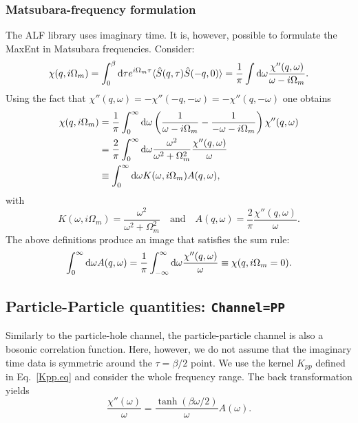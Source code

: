 \subsubsection*{Matsubara-frequency formulation}
The ALF  library uses  imaginary time. It is, however, possible to formulate the MaxEnt in  Matsubara frequencies.
Consider:
\begin{equation}
  \chi(q,i\Omega_m) = \int_0^{\beta} \mathrm{d} \tau  e^{i \Omega_m \tau}
	\langle \hat{S}(q,\tau) \hat{S}(-q,0) \rangle  = \frac{1}{\pi}
   \int \mathrm{d} \omega  \frac{\chi''(q,\omega)}{ \omega - i \Omega_m }.
\end{equation}
Using the fact that $\chi''(q,\omega) = -\chi''(-q,-\omega) = -\chi''(q,-\omega)$ one obtains
\begin{align}
  \chi(q,i\Omega_m) &= 
	\frac{1}{\pi}
   \int_0^{\infty} \mathrm{d} \omega \left(\frac{1}{ \omega - i \Omega_m } - \frac{1}{ -\omega - i \Omega_m } \right)
         \chi''(q,\omega) \nonumber \\ 
    &= \frac{2}{\pi} \int_0^{\infty} \mathrm{d} \omega \frac{\omega^2}{ \omega^2  + \Omega_m^2 } 
  \frac{\chi''(q,\omega)}{\omega} \\
    &\equiv \int_0^{\infty} \mathrm{d} \omega K(\omega,i\Omega_m) A(q,\omega), \nonumber
\end{align}
with
\begin{equation}
   K(\omega,i\Omega_m) = \frac{\omega^2}{ \omega^2  + \Omega_m^2 } \quad \text{and} \quad
A(q,\omega) =  \frac{2}{\pi}   \frac{\chi''(q,\omega)}{\omega} .
\end{equation}
The above definitions produce an image that satisfies the sum rule:
\begin{equation}
\int_0^{\infty} \mathrm{d} \omega A(q,\omega) =  \frac{1}{\pi}  \int_{-\infty}^{\infty} \mathrm{d} \omega 
   \frac{\chi''(q,\omega)}{\omega}   \equiv \chi(q,i\Omega_m=0) .
\end{equation}


\subsection{Particle-Particle quantities: \texttt{Channel=PP}}

Similarly to the particle-hole channel, the particle-particle channel is also a bosonic correlation function. Here, however, we do not assume that the  imaginary time data is symmetric around   the $\tau = \beta/2$ point.  We use the kernel $K_{pp}$ defined in Eq.~\eqref{Kpp.eq}  and consider the whole frequency range. 
The back transformation  yields
\begin{equation}
 \frac{\chi''(\omega)} {\omega}   = \frac{\tanh \left( \beta \omega/2 \right) }{ \omega }   A(\omega) .
\end{equation}


